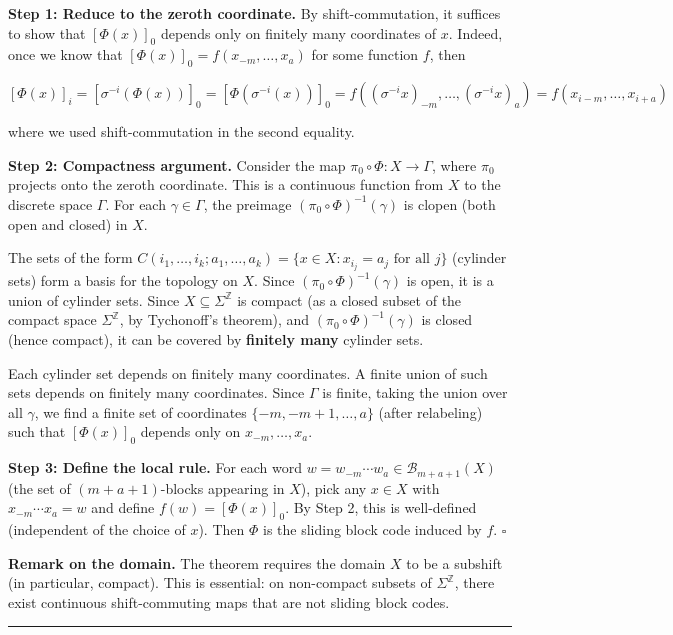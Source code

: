 \textbf{Step 1: Reduce to the zeroth coordinate.} By shift-commutation, it suffices to show that $[\Phi(x)]_0$ depends only on finitely many coordinates of $x$. Indeed, once we know that $[\Phi(x)]_0 = f(x_{-m}, \ldots, x_a)$ for some function $f$, then

\[
[\Phi(x)]_i = [\sigma^{-i}(\Phi(x))]_0 = [\Phi(\sigma^{-i}(x))]_0 = f((\sigma^{-i} x)_{-m}, \ldots, (\sigma^{-i} x)_a) = f(x_{i-m}, \ldots, x_{i+a})
\]

where we used shift-commutation in the second equality.

\textbf{Step 2: Compactness argument.} Consider the map $\pi_0 \circ \Phi: X \to \Gamma$, where $\pi_0$ projects onto the zeroth coordinate. This is a continuous function from $X$ to the discrete space $\Gamma$. For each $\gamma \in \Gamma$, the preimage $(\pi_0 \circ \Phi)^{-1}(\gamma)$ is clopen (both open and closed) in $X$.

The sets of the form $C(i_1, \ldots, i_k; a_1, \ldots, a_k) = \{ x \in X : x_{i_j} = a_j \text{ for all } j\} $ (cylinder sets) form a basis for the topology on $X$. Since $(\pi_0 \circ \Phi)^{-1}(\gamma)$ is open, it is a union of cylinder sets. Since $X \subseteq \Sigma^\mathbb{Z}$ is compact (as a closed subset of the compact space $\Sigma^\mathbb{Z}$, by Tychonoff's theorem), and $(\pi_0 \circ \Phi)^{-1}(\gamma)$ is closed (hence compact), it can be covered by \textbf{finitely many} cylinder sets.

Each cylinder set depends on finitely many coordinates. A finite union of such sets depends on finitely many coordinates. Since $\Gamma$ is finite, taking the union over all $\gamma$, we find a finite set of coordinates $\{ -m, -m+1, \ldots, a\} $ (after relabeling) such that $[\Phi(x)]_0$ depends only on $x_{-m}, \ldots, x_a$.

\textbf{Step 3: Define the local rule.} For each word $w = w_{-m} \cdots w_a \in \mathcal{B}_{m+a+1}(X)$ (the set of $(m+a+1)$-blocks appearing in $X$), pick any $x \in X$ with $x_{-m} \cdots x_a = w$ and define $f(w) = [\Phi(x)]_0$. By Step 2, this is well-defined (independent of the choice of $x$). Then $\Phi$ is the sliding block code induced by $f$. $\square$

\textbf{Remark on the domain.} The theorem requires the domain $X$ to be a subshift (in particular, compact). This is essential: on non-compact subsets of $\Sigma^\mathbb{Z}$, there exist continuous shift-commuting maps that are not sliding block codes.

\bigskip\hrule\bigskip

